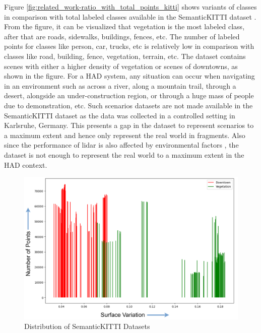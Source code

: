 Figure \ref{fig:related_work-ratio_with_total_points_kitti} shows variants of classes in comparison with total labeled classes available in the SemanticKITTI dataset \parencite{behley2019semantickitti, sem_kitti_total_points_ratio}. From the figure, it can be visualized that vegetation is the most labeled class, after that are roads, sidewalks, buildings, fences, etc. The number of labeled points for classes like person, car, trucks, etc is relatively low in comparison with classes like road, building, fence, vegetation, terrain, etc. The dataset contains scenes with either a higher density of vegetation or scenes of downtowns, as shown in the figure. For a HAD system, any situation can occur when navigating in an environment such as across a river, along a mountain trail, through a desert, alongside an under-construction region, or through a huge mass of people due to demonstration, etc. Such scenarios datasets are not made available in the SemanticKITTI dataset as the data was collected in a controlled setting in Karlsruhe, Germany. This presents a gap in the dataset to represent scenarios to a maximum extent and hence only represent the real world in fragments. Also since the performance of lidar is also affected by environmental factors \parencite{park2023automotive}, the dataset is not enough to represent the real world to a maximum extent in the HAD context.

\begin{figure}[htb]
    \centering
    \includegraphics[width=1\linewidth]{97_graphics/related_work/downtown_and_vegetation_sv.pdf}
    \caption{Distribution of SemanticKITTI Datasets}
    \label{fig:related_work-downtown_and_vegetation_sv}
\end{figure}

